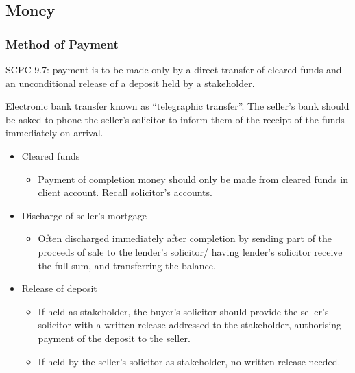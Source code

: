 \documentclass[
]{article}
\providecommand{\tightlist}{%
  \setlength{\itemsep}{0pt}\setlength{\parskip}{0pt}}
\begin{document}
\hypertarget{money}{%
\subsection{Money}\label{money}}

\hypertarget{method-of-payment}{%
\subsubsection{Method of Payment}\label{method-of-payment}}

SCPC 9.7: payment is to be made only by a direct transfer of cleared
funds and an unconditional release of a deposit held by a stakeholder.

Electronic bank transfer known as ``telegraphic transfer''. The seller's
bank should be asked to phone the seller's solicitor to inform them of
the receipt of the funds immediately on arrival.

\begin{itemize}
\tightlist
\item
  Cleared funds

  \begin{itemize}
  \tightlist
  \item
    Payment of completion money should only be made from cleared funds
    in client account. Recall solicitor's accounts.
  \end{itemize}
\item
  Discharge of seller's mortgage

  \begin{itemize}
  \tightlist
  \item
    Often discharged immediately after completion by sending part of the
    proceeds of sale to the lender's solicitor/ having lender's
    solicitor receive the full sum, and transferring the balance.
  \end{itemize}
\item
  Release of deposit

  \begin{itemize}
  \tightlist
  \item
    If held as stakeholder, the buyer's solicitor should provide the
    seller's solicitor with a written release addressed to the
    stakeholder, authorising payment of the deposit to the seller.
  \item
    If held by the seller's solicitor as stakeholder, no written release
    needed.
  \end{itemize}
\end{itemize}
\end{document}
